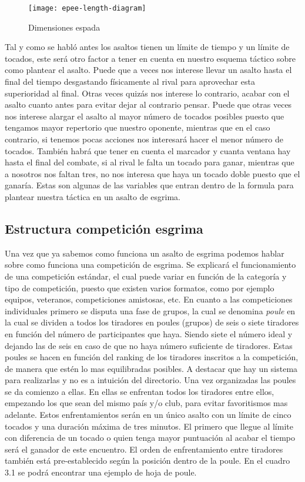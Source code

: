 \begin{figure}[htb]
	\centering
	\texttt{[image: epee-length-diagram]}
	\caption[Dimensiones espada]{Dimensiones espada}
	\label{epee-length-diagram}
\end{figure}

Tal y como se habló antes los asaltos tienen un límite de tiempo y un límite de tocados,
 este será otro factor a tener en cuenta en nuestro esquema táctico sobre como plantear el asalto.
 Puede que a veces nos interese llevar un asalto hasta el final del tiempo desgastando físicamente al
 rival para aprovechar esta superioridad al final. Otras veces quizás nos interese lo contrario,
 acabar con el asalto cuanto antes para evitar dejar al contrario pensar. Puede que otras veces nos
 interese alargar el asalto al mayor número de tocados posibles puesto que tengamos mayor
 repertorio que nuestro oponente, mientras que en el caso contrario, si tenemos pocas acciones nos interesará
 hacer el menor número de tocados. También habrá que tener en cuenta el marcador y cuanta ventana hay
 hasta el final del combate, si al rival le falta un tocado para ganar, mientras que a nosotros nos faltan
 tres, no nos interesa que haya un tocado doble puesto que el ganaría. Estas son algunas de las variables
 que entran dentro de la formula para plantear nuestra táctica en un asalto de esgrima.

\subsection{Estructura competición esgrima}

Una vez que ya sabemos como funciona un asalto de esgrima podemos hablar sobre como funciona una competición
 de esgrima. Se explicará el funcionamiento
 de una competición estándar, el cual puede variar en función de la categoría y tipo de competición, puesto que
 existen varios formatos, como por ejemplo equipos, veteranos, competiciones amistosas, etc.
 En cuanto a las competiciones individuales primero se disputa una fase de grupos, la cual se denomina
 \textit{poule} en la cual se dividen a todos los tiradores en poules (grupos) de seis o siete tiradores en función
 del número de participantes que haya. Siendo siete el número ideal y dejando las de seis en caso de que
 no haya número suficiente de tiradores. Estas poules se hacen en función del ranking de los tiradores inscritos
 a la competición, de manera que estén lo mas equilibradas posibles. A destacar que hay un sistema para realizarlas y no
 es a intuición del directorio. Una vez organizadas las poules se da
 comienzo a ellas. En ellas se enfrentan todos los tiradores entre ellos, empezando los que sean del mismo
 país y/o club, para evitar favoritismos mas adelante. Estos enfrentamientos serán en un único asalto con un
 límite de cinco tocados y una duración máxima de tres minutos. El primero que llegue al límite con diferencia
 de un tocado o quien tenga mayor puntuación al acabar el tiempo será el ganador de este encuentro. El orden
 de enfrentamiento entre tiradores también está pre-establecido según la posición dentro de la poule.
 En el cuadro 3.1 se podrá encontrar una ejemplo de hoja de poule.

